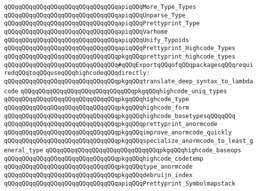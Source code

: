 \verb|qQQqqQQqqQQqqQQqqQQqqQQqqQQqqQQqapiqQQqMore_Type_Types|\newline
\verb|qQQqqQQqqQQqqQQqqQQqqQQqqQQqqQQqapiqQQqUnparse_Type|\newline
\verb|qQQqqQQqqQQqqQQqqQQqqQQqqQQqqQQqapiqQQqPrettyprint_Type|\newline
\verb|qQQqqQQqqQQqqQQqqQQqqQQqqQQqqQQqapiqQQqVarhome|\newline
\verb|qQQqqQQqqQQqqQQqqQQqqQQqqQQqqQQqapiqQQqUnify_Typoids|\newline
\newline
\newline
\verb|qQQqqQQqqQQqqQQqqQQqqQQqqQQqqQQqapiqQQqPrettyprint_Highcode_Types|\newline
\verb|qQQqqQQqqQQqqQQqqQQqqQQqqQQqqQQqpkgqQQqprettyprint_highcode_types|\newline
\newline
\verb|qQQqqQQqqQQqqQQqqQQqqQQqqQQqqQQq#qQQqExportqQQqofqQQqpackagesqQQqrequiredqQQqtoqQQquseqQQqhighcodeqQQqdirectly:|\newline
\verb|qQQqqQQqqQQqqQQqqQQqqQQqqQQqqQQqpkgqQQqtranslate_deep_syntax_to_lambdacode|\newline
\verb|qQQqqQQqqQQqqQQqqQQqqQQqqQQqqQQqpkgqQQqhighcode_uniq_types|\newline
\verb|qQQqqQQqqQQqqQQqqQQqqQQqqQQqqQQqpkgqQQqhighcode_type|\newline
\verb|qQQqqQQqqQQqqQQqqQQqqQQqqQQqqQQqpkgqQQqhighcode_form|\newline
\verb|qQQqqQQqqQQqqQQqqQQqqQQqqQQqqQQqpkgqQQqhighcode_basetypesqQQqqQQq|\newline
\verb|qQQqqQQqqQQqqQQqqQQqqQQqqQQqqQQqpkgqQQqprettyprint_anormcode|\newline
\verb|qQQqqQQqqQQqqQQqqQQqqQQqqQQqqQQqpkgqQQqimprove_anormcode_quickly|\newline
\verb|qQQqqQQqqQQqqQQqqQQqqQQqqQQqqQQqpkgqQQqspecialize_anormcode_to_least_general_type|\newline
\verb|qQQqqQQqqQQqqQQqqQQqqQQqqQQqqQQqpkgqQQqhighcode_baseops|\newline
\verb|qQQqqQQqqQQqqQQqqQQqqQQqqQQqqQQqpkgqQQqhighcode_codetemp|\newline
\verb|qQQqqQQqqQQqqQQqqQQqqQQqqQQqqQQqpkgqQQqtype_anormcode|\newline
\verb|qQQqqQQqqQQqqQQqqQQqqQQqqQQqqQQqpkgqQQqdebruijn_index|\newline
\newline
\verb|qQQqqQQqqQQqqQQqqQQqqQQqqQQqqQQqapiqQQqPrettyprint_Symbolmapstack|\newline

